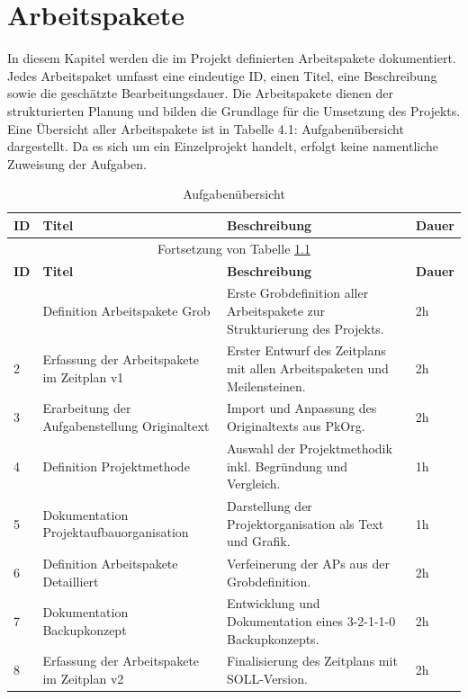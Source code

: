\chapter{Arbeitspakete}
\vspace{-3em}
In diesem Kapitel werden die im Projekt definierten Arbeitspakete dokumentiert. Jedes Arbeitspaket umfasst eine eindeutige ID, einen Titel, eine Beschreibung sowie die geschätzte Bearbeitungsdauer. Die Arbeitspakete dienen der strukturierten Planung und bilden die Grundlage für die Umsetzung des Projekts. Eine Übersicht aller Arbeitspakete ist in Tabelle 4.1: Aufgabenübersicht dargestellt. Da es sich um ein Einzelprojekt handelt, erfolgt keine namentliche Zuweisung der Aufgaben.

\begin{longtable}{|l|p{}|p{}|l|}
  \caption{Aufgabenübersicht} \label{tab:aufgaben} \\
  \hline
  \textbf{ID} & \textbf{Titel} & \textbf{Beschreibung} & \textbf{Dauer} \\
  \hline
  \endfirsthead
  \multicolumn{4}{c}{Fortsetzung von Tabelle \ref{tab:aufgaben}} \\
  \hline
  \textbf{ID} & \textbf{Titel} & \textbf{Beschreibung} & \textbf{Dauer} \\
  \hline
  \endhead
  \hline
  \endfoot
  1 & Definition Arbeitspakete Grob & Erste Grobdefinition aller Arbeitspakete zur Strukturierung des Projekts. & 2h \\ 
  \hline
  2 & Erfassung der Arbeitspakete im Zeitplan v1 & Erster Entwurf des Zeitplans mit allen Arbeitspaketen und Meilensteinen. & 2h \\ 
  \hline
  3 & Erarbeitung der Aufgabenstellung Originaltext & Import und Anpassung des Originaltexts aus PkOrg. & 2h \\
  \hline
  4 & Definition Projektmethode & Auswahl der Projektmethodik inkl. Begründung und Vergleich. & 1h \\
  \hline
  5 & Dokumentation Projektaufbauorganisation & Darstellung der Projektorganisation als Text und Grafik. & 1h \\
  \hline
  6 & Definition Arbeitspakete Detailliert & Verfeinerung der APs aus der Grobdefinition. & 2h \\
  \hline
  7 & Dokumentation Backupkonzept & Entwicklung und Dokumentation eines 3-2-1-1-0 Backupkonzepts. & 2h \\
  \hline
  8 & Erfassung der Arbeitspakete im Zeitplan v2 & Finalisierung des Zeitplans mit SOLL-Version. & 2h \\

\end{longtable}
